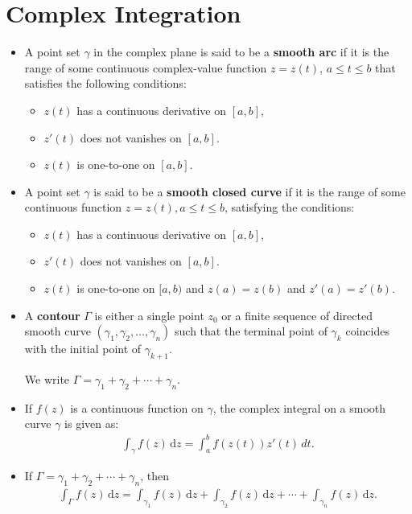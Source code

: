 \documentclass[10pt]{article}
\newcommand{\dee}{\mathrm{d}}
\begin{document}
  \section{Complex Integration} %
  \label{sec:complex_integration}

  \begin{itemize}
    \item A point set $\gamma$ in the complex plane is said to be a {\bf smooth arc} if it is the range of some continuous complex-value function $z = z(t)$, $a \leq t \leq b$ that satisfies the following conditions:
    \begin{itemize}
      \item $z(t)$ has a continuous derivative on $[a,b]$,
      \item $z'(t)$ does not vanishes on $[a,b]$.
      \item $z(t)$ is one-to-one on $[a,b].$
    \end{itemize}

    \item A point set $\gamma$ is said to be a {\bf smooth closed curve} if it is the range of some continuous function $z = z(t), a \leq t \leq b$, satisfying the conditions:
    \begin{itemize}
      \item $z(t)$ has a continuous derivative on $[a,b]$,
      \item $z'(t)$ does not vanishes on $[a,b]$.
      \item $z(t)$ is one-to-one on $[a,b)$ and $z(a) = z(b)$ and $z'(a) = z'(b)$.
    \end{itemize}

    \item A {\bf contour} $\Gamma$ is either a single point $z_0$ or a finite sequence of directed smooth curve $(\gamma_1, \gamma_2, \dotsc, \gamma_n)$ such that the terminal point of $\gamma_k$ coincides with the initial point of $\gamma_{k+1}$.

    We write $\Gamma = \gamma_1 + \gamma_2 + \dotsb + \gamma_n.$

    \item If $f(z)$ is a continuous function on $\gamma$, the complex integral on a smooth curve $\gamma$ is given as:
    \begin{align*}
      \int_\gamma f(z)\, \dee z = \int_{a}^b f(z(t))z'(t)\, dt.
    \end{align*}

    \item If $\Gamma = \gamma_1 + \gamma_2 + \dotsb + \gamma_n$, then
    \begin{align*}
      \int_\Gamma f(z)\, \dee z = \int_{\gamma_1} f(z)\, \dee z + \int_{\gamma_2} f(z)\, \dee z + \dotsb + \int_{\gamma_n} f(z)\, \dee z.
    \end{align*}


\end{itemize}
\end{document}
